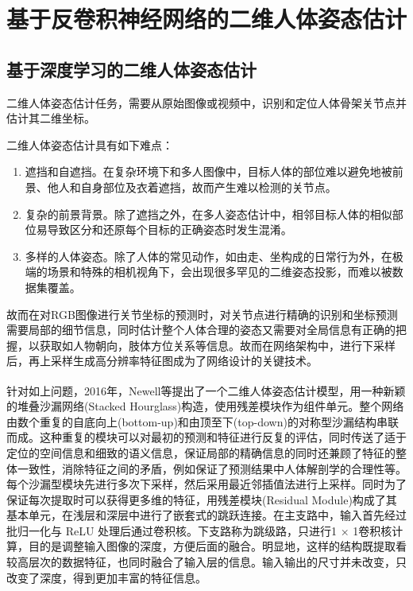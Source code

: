 
\chapter{基于反卷积神经网络的二维人体姿态估计}

\section{基于深度学习的二维人体姿态估计}
二维人体姿态估计任务，需要从原始图像或视频中，识别和定位人体骨架关节点并估计其二维坐标。

二维人体姿态估计具有如下难点：

\begin{enumerate}
    \item 遮挡和自遮挡。在复杂环境下和多人图像中，目标人体的部位难以避免地被前景、他人和自身部位及衣着遮挡，故而产生难以检测的关节点。
    \item 复杂的前景背景。除了遮挡之外，在多人姿态估计中，相邻目标人体的相似部位易导致区分和还原每个目标的正确姿态时发生混淆。
    \item 多样的人体姿态。除了人体的常见动作，如由走、坐构成的日常行为外，在极端的场景和特殊的相机视角下，会出现很多罕见的二维姿态投影，而难以被数据集覆盖。

\end{enumerate}

故而在对RGB图像进行关节坐标的预测时，对关节点进行精确的识别和坐标预测需要局部的细节信息，同时估计整个人体合理的姿态又需要对全局信息有正确的把握，以获取如人物朝向，肢体方位关系等信息。故而在网络架构中，进行下采样后，再上采样生成高分辨率特征图成为了网络设计的关键技术。

针对如上问题，2016年，Newell等提出了一个二维人体姿态估计模型\textsuperscript{\cite{p23}}，用一种新颖的堆叠沙漏网络(Stacked Hourglass)构造，使用残差模块作为组件单元。整个网络由数个重复的自底向上(bottom-up)和由顶至下(top-down)的对称型沙漏结构串联而成。这种重复的模块可以对最初的预测和特征进行反复的评估，同时传送了适于定位的空间信息和细致的语义信息，保证局部的精确信息的同时还兼顾了特征的整体一致性，消除特征之间的矛盾，例如保证了预测结果中人体解剖学的合理性等。每个沙漏型模块先进行多次下采样，然后采用最近邻插值法进行上采样。同时为了保证每次提取时可以获得更多维的特征，用残差模块(Residual Module)构成了其基本单元，在浅层和深层中进行了嵌套式的跳跃连接。在主支路中，输入首先经过批归一化与 ReLU 处理后通过卷积核。下支路称为跳级路，只进行1 × 1卷积核计算，目的是调整输入图像的深度，方便后面的融合。明显地，这样的结构既提取看较高层次的数据特征，也同时融合了输入层的信息。输入输出的尺寸并未改变，只改变了深度，得到更加丰富的特征信息。

